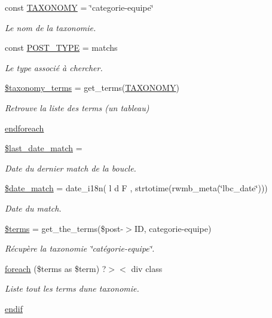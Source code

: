 \begin{DoxyCompactItemize}
\item 
const \hyperlink{archive-matchs_8php_a1dc6041def2926dbb45188d4f766d4b3}{T\+A\+X\+O\+N\+O\+MY} = \char`\"{}categorie-\/equipe\char`\"{}
\begin{DoxyCompactList}\small\item\em Le nom de la taxonomie. \end{DoxyCompactList}\item 
const \hyperlink{archive-matchs_8php_aef7d3346406e86714e365321541f4d97}{P\+O\+S\+T\+\_\+\+T\+Y\+PE} = \textquotesingle{}matchs\textquotesingle{}
\begin{DoxyCompactList}\small\item\em Le type associé à chercher. \end{DoxyCompactList}\item 
\hyperlink{archive-matchs_8php_a1bb9ed78e368f91696e146ce36663486}{\$taxonomy\+\_\+terms} = get\+\_\+terms(\hyperlink{archive-matchs_8php_a1dc6041def2926dbb45188d4f766d4b3}{T\+A\+X\+O\+N\+O\+MY})
\begin{DoxyCompactList}\small\item\em Retrouve la liste des terms (un tableau) \end{DoxyCompactList}\item 
\hyperlink{archive-matchs_8php_a672d9707ef91db026c210f98cc601123}{endforeach}
\item 
\hyperlink{archive-matchs_8php_ae59c5fee360f6a47ff7e4847a26a6509}{\$last\+\_\+date\+\_\+match} = \textquotesingle{}\textquotesingle{}
\begin{DoxyCompactList}\small\item\em Date du dernier match de la boucle. \end{DoxyCompactList}\item 
\hyperlink{archive-matchs_8php_a9dccec06b3547f7c82bc8ade68a042a5}{\$date\+\_\+match} = date\+\_\+i18n(\textquotesingle{} l d F \textquotesingle{}, strtotime(rwmb\+\_\+meta(\char`\"{}lbc\+\_\+date\char`\"{})))
\begin{DoxyCompactList}\small\item\em Date du match. \end{DoxyCompactList}\item 
\hyperlink{archive-matchs_8php_ad6d756efb764174cfe7a6e9abc97e3eb}{\$terms} = get\+\_\+the\+\_\+terms(\$post-\/$>$ID, \textquotesingle{}categorie-\/equipe\textquotesingle{})
\begin{DoxyCompactList}\small\item\em Récupère la taxonomie \char`\"{}catégorie-\/equipe\char`\"{}. \end{DoxyCompactList}\item 
\hyperlink{archive-matchs_8php_acef14cb9dd3a31dcc9b59c773f76807e}{foreach} (\$terms as \$term) ?$>$$<$ div class
\begin{DoxyCompactList}\small\item\em Liste tout les terms d\textquotesingle{}une taxonomie. \end{DoxyCompactList}\item 
\hyperlink{archive-matchs_8php_a82cd33ca97ff99f2fcc5e9c81d65251b}{endif}
\end{DoxyCompactItemize}



